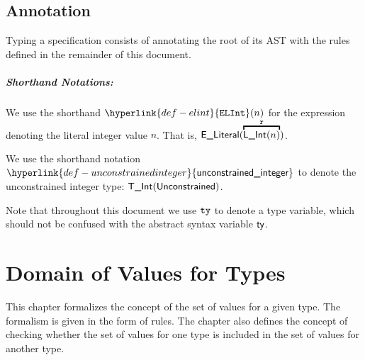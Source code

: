 \documentclass{book}
\newcommand\unconstrainedinteger[0]{\hyperlink{def-unconstrainedinteger}{\textsf{unconstrained\_integer}}}
\newcommand\ELInt[1]{\hyperlink{def-elint}{\texttt{ELInt}}(#1)}
\newcommand\annotatestmt[1]{\hyperlink{def-annotatestmt}{\texttt{annotate\_stmt}}(#1)}
\newcommand\tenvone[0]{\texttt{tenv1}}
\newcommand\tenvtwo[0]{\texttt{tenv2}}
\newcommand\vs[0]{\texttt{s}}
\newcommand\vsone[0]{\texttt{s1}}
\newcommand\vstwo[0]{\texttt{s2}}
\newcommand\newsone[0]{\texttt{new\_s1}}
\newcommand\newstwo[0]{\texttt{new\_s2}}
\begin{document}

\section{Annotation}

Typing a specification consists of annotating the root of its AST with the rules defined
in the remainder of this document.

\paragraph{Shorthand Notations:}
\hypertarget{def-elint}{}
We use the shorthand $\ELInt{n}$ for the expression denoting the literal integer value $n$. That is, $\ELiteral(\overname{\lint(n)}{\vr})$.

\hypertarget{def-unconstrainedinteger}{}
We use the shorthand notation $\unconstrainedinteger$ to denote the unconstrained integer type: $\textsf{T\_Int}(\textsf{Unconstrained})$.

Note that throughout this document we use $\texttt{ty}$ to denote a type variable, which should not be confused with the abstract syntax variable $\textsf{ty}$.

\chapter{Domain of Values for Types}
This chapter formalizes the concept of the set of values for a given type.
The formalism is given in the form of rules.
%
The chapter also defines the concept of checking whether the set of values
for one type is included in the set of values for another type.
\end{document}
